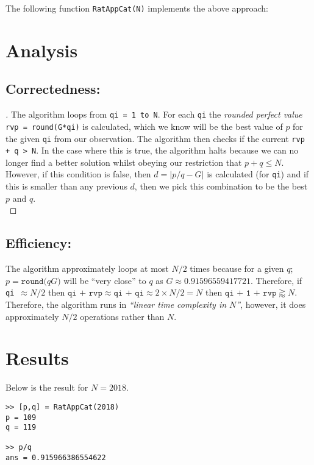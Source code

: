 \documentclass[11pt]{report}
\begin{document}
The following function \texttt{RatAppCat(N)} implements the above approach:


\section{Analysis}
\subsection{Correctedness:}
\begin{proof}[\unskip\nopunct]
The algorithm loops from \texttt{qi = 1 to N}. For each \texttt{qi} the \textit{rounded perfect value} \texttt{rvp = round(G*qi)} is calculated, which we know will be the best value of $p$ for the given \texttt{qi} from our observation. The algorithm then checks if the current \texttt{rvp + q > N}. In the case where this is true, the algorithm halts because we can no longer find a better solution whilst obeying our restriction that $p+q\leq N$. \\

However, if this condition is false, then $d=|p/q - G|$ is calculated (for \texttt{qi}) and if this is smaller than any previous $d$, then we pick this combination to be the best $p$ and $q$. \\
\end{proof}

\subsection{Efficiency:}
The algorithm approximately loops at most $N/2$ times because for a given $q$; $p = \texttt{round(}qG\texttt{)}$ will be ``very close'' to $q$ as $G\approx 0.91596559417721$. Therefore, if \texttt{qi $\approx N/2$} then $\texttt{qi + rvp} \approx \texttt{qi + qi} \approx 2\times N/2 = N$ then $\texttt{qi + 1 + rvp} \gtrapprox N$. \\

Therefore, the algorithm runs in \textit{``linear time complexity in $N$''}, however, it does approximately $N/2$ operations rather than $N$. 

\section{Results} 
Below is the result for $N=2018$. \\

\begin{lstlisting}[title={N=2018}]
>> [p,q] = RatAppCat(2018)
p = 109
q = 119

>> p/q 
ans = 0.915966386554622
\end{lstlisting}
\end{document}
